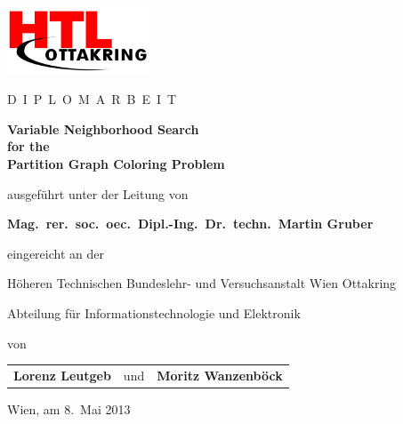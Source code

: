\begin{titlepage}
\begin{center}
\includegraphics[height=2cm]{../img/htl.png}

\vspace{10mm}

{\Large D}\ {\large I\ P\ L\ O\ M\ A\ R\ B\ E\ I\ T}

\vspace{25mm}

{\Huge\bfseries\sffamily Variable Neighborhood Search}\\[3mm]
{\Huge\bfseries\sffamily for the}\\[3mm]
{\Huge\bfseries\sffamily Partition Graph Coloring Problem}

\vspace{25mm}

ausgeführt unter der Leitung von

\vspace{5mm}

{\large\bfseries Mag.~rer.~soc.~oec.\ Dipl.-Ing.\ Dr.~techn.\ Martin Gruber}

\vspace{5mm}

eingereicht an der

\vspace{5mm}

{\large Höheren Technischen Bundeslehr- und Versuchsanstalt Wien Ottakring}

{\large Abteilung für Informationstechnologie und Elektronik}

\vspace{5mm}

von

\vspace{5mm}

\begin{tabular}{R{5cm}C{2.5cm}L{5cm}}
{\large\bfseries Lorenz Leutgeb} & und & {\large\bfseries Moritz Wanzenböck} \\
\end{tabular}

\end{center}
\vspace*{\fill}

Wien, am 8.~Mai 2013
\end{titlepage}
